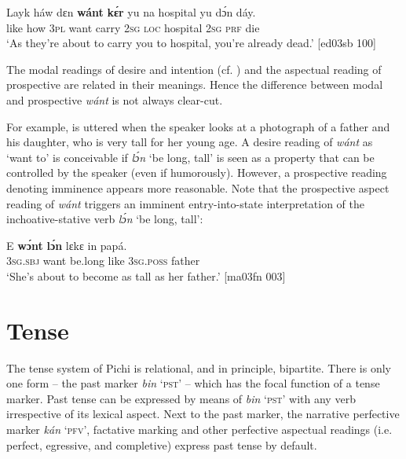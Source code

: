 \ea%
    \label{ex:key:372}
    \gll Layk  háw    dɛn  \textbf{wánt}  \textbf{kɛ́r}    yu  na  hospital
yu  dɔ́n    dáy.\\
like    how    \textsc{3pl}  want  carry  \textsc{2sg}  \textsc{loc}  hospital
\textsc{2sg}  \textsc{prf}    die\\

\glt ‘As they’re about to carry you to hospital, you’re already dead.’ [ed03sb 100]
\z

The modal readings of desire and intention (cf. ) and the aspectual reading of prospective are related in their meanings. Hence the difference between modal and prospective \textit{wánt} is not always clear-cut.


For example,  is uttered when the speaker looks at a photograph of a father and his daughter, who is very tall for her young age. A desire reading of \textit{wánt} as ‘want to’ is conceivable if \textit{lɔ́n} ‘be long, tall’ is seen as a property that can be controlled by the speaker (even if humorously). However, a prospective reading denoting imminence appears more reasonable. Note that the prospective aspect reading of \textit{wánt} triggers an imminent entry-into-state interpretation of the inchoative-stative verb \textit{lɔ́n} ‘be long, tall’:



\ea%
    \label{ex:key:373}
    \gll E    \textbf{wɔ́nt} \textbf{lɔ́n}    lɛkɛ  in    papá.\\
\textsc{3sg.sbj}  want  be.long  like  \textsc{3sg.poss}  father\\

\glt ‘She’s about to become as tall as her father.’ [ma03fn 003]
\z

\section{Tense}\label{sec:6.5}

The tense system of Pichi is relational, and in principle, bipartite. There is only one form – the past marker \textit{bin} ‘\textsc{pst’} – which has the focal function of a tense marker. Past tense can be expressed by means of \textit{bin} ‘\textsc{pst}’ with any verb irrespective of its lexical aspect. Next to the past marker, the narrative perfective marker \textit{kán} ‘\textsc{pfv}’, factative marking and other perfective aspectual readings (i.e. perfect, egressive, and completive) express past tense by default. 


